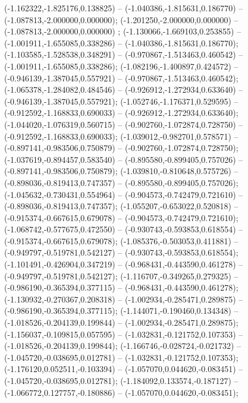  (-1.162322,-1.825176,0.138825) -- (-1.040386,-1.815631,0.186770) -- (-1.087813,-2.000000,0.000000);
 (-1.201250,-2.000000,0.000000) -- (-1.087813,-2.000000,0.000000) ;
 (-1.130066,-1.669103,0.253855) -- (-1.001911,-1.655085,0.338286) -- (-1.040386,-1.815631,0.186770);
 (-1.103585,-1.528538,0.348291) -- (-0.970867,-1.513463,0.460542) -- (-1.001911,-1.655085,0.338286);
 (-1.082196,-1.400897,0.424572) -- (-0.946139,-1.387045,0.557921) -- (-0.970867,-1.513463,0.460542);
 (-1.065378,-1.284082,0.484546) -- (-0.926912,-1.272934,0.633640) -- (-0.946139,-1.387045,0.557921);
 (-1.052746,-1.176371,0.529595) -- (-0.912592,-1.168833,0.690033) -- (-0.926912,-1.272934,0.633640);
 (-1.044020,-1.076319,0.560715) -- (-0.902760,-1.072874,0.728750) -- (-0.912592,-1.168833,0.690033);
 (-1.039012,-0.982701,0.578571) -- (-0.897141,-0.983506,0.750879) -- (-0.902760,-1.072874,0.728750);
 (-1.037619,-0.894457,0.583540) -- (-0.895580,-0.899405,0.757026) -- (-0.897141,-0.983506,0.750879);
 (-1.039810,-0.810648,0.575726) -- (-0.898036,-0.819413,0.747357) -- (-0.895580,-0.899405,0.757026);
 (-1.045632,-0.730431,0.554964) -- (-0.904573,-0.742479,0.721610) -- (-0.898036,-0.819413,0.747357);
 (-1.055207,-0.653022,0.520818) -- (-0.915374,-0.667615,0.679078) -- (-0.904573,-0.742479,0.721610);
 (-1.068742,-0.577675,0.472550) -- (-0.930743,-0.593853,0.618554) -- (-0.915374,-0.667615,0.679078);
 (-1.085376,-0.503053,0.411881) -- (-0.949797,-0.519781,0.542127) -- (-0.930743,-0.593853,0.618554);
 (-1.101491,-0.426904,0.347219) -- (-0.968431,-0.443590,0.461278) -- (-0.949797,-0.519781,0.542127);
 (-1.116707,-0.349265,0.279325) -- (-0.986190,-0.365394,0.377115) -- (-0.968431,-0.443590,0.461278);
 (-1.130932,-0.270367,0.208318) -- (-1.002934,-0.285471,0.289875) -- (-0.986190,-0.365394,0.377115);
 (-1.144071,-0.190460,0.134348) -- (-1.018526,-0.204139,0.199844) -- (-1.002934,-0.285471,0.289875);
 (-1.156037,-0.109815,0.057595) -- (-1.032831,-0.121752,0.107353) -- (-1.018526,-0.204139,0.199844);
 (-1.166746,-0.028724,-0.021732) -- (-1.045720,-0.038695,0.012781) -- (-1.032831,-0.121752,0.107353);
 (-1.176120,0.052511,-0.103394) -- (-1.057070,0.044620,-0.083451) -- (-1.045720,-0.038695,0.012781);
 (-1.184092,0.133574,-0.187127) -- (-1.066772,0.127757,-0.180886) -- (-1.057070,0.044620,-0.083451);
